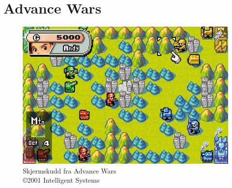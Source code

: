 \section{Advance Wars} \label{app:aw}
\begin{figure} [H]
		\begin{center}
		\includegraphics[width=\textwidth]{images/screenshot_aw}
		\caption{Skjermskudd fra Advance Wars \\ \copyright 2001 Intelligent Systems}
		\end{center}
	\end{figure}
